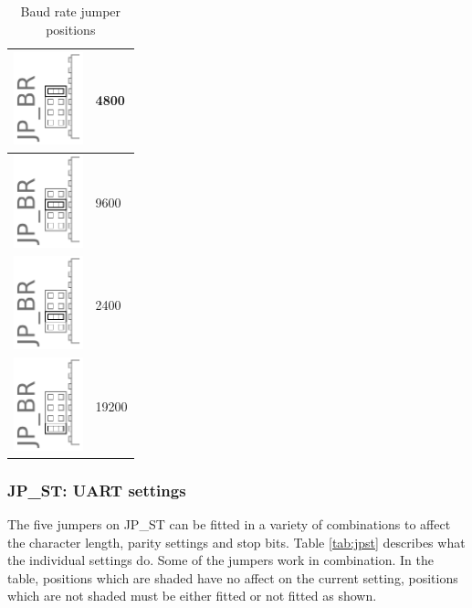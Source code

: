 \documentclass[a4paper,10pt]{book}
\begin{document}
\begin{table}[h]
 \begin{tabular}{| l | l |}
  \hline
  \includegraphics[width=2cm]{jpbr1.pdf}&4800\\
  \hline
  \includegraphics[width=2cm]{jpbr2.pdf}&9600\\
  \hline
  \includegraphics[width=2cm]{jpbr3.pdf}&2400\\
  \hline
  \includegraphics[width=2cm]{jpbr4.pdf}&19200\\
  \hline
 \end{tabular}
 \caption{Baud rate jumper positions}
 \label{tab:jpbr}
\end{table}

\subsubsection{JP\_ST: UART settings}
The five jumpers on JP\_ST can be fitted in a variety of combinations to affect the character length, parity settings and stop bits.  Table \ref{tab:jpst} describes what the individual settings do.  Some of the jumpers work in combination.  In the table, positions which are shaded have no affect on the current setting, positions which are not shaded must be either fitted or not fitted as shown.
\end{document}
